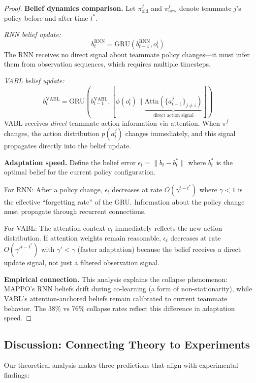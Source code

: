 \documentclass{article}
\theoremstyle{plain}
\theoremstyle{definition}
\theoremstyle{remark}
\begin{document}
\begin{proof}
\textbf{Belief dynamics comparison.}
Let $\pi_{\mathrm{old}}^j$ and $\pi_{\mathrm{new}}^j$ denote teammate $j$'s policy before and after time $t^*$.

\emph{RNN belief update:}
\[
b_t^{\mathrm{RNN}} = \text{GRU}(b_{t-1}^{\mathrm{RNN}}, o_t^i)
\]
The RNN receives no direct signal about teammate policy changes---it must infer them from observation sequences, which requires multiple timesteps.

\emph{VABL belief update:}
\[
b_t^{\mathrm{VABL}} = \text{GRU}(b_{t-1}^{\mathrm{VABL}}, [\phi(o_t^i) \| \underbrace{\mathrm{Attn}(\{a_{t-1}^j\}_{j \neq i})}_{\text{direct action signal}}])
\]
VABL receives \emph{direct} teammate action information via attention. When $\pi^j$ changes, the action distribution $p(a_t^j)$ changes immediately, and this signal propagates directly into the belief update.

\textbf{Adaptation speed.}
Define the belief error $\epsilon_t = \|b_t - b_t^*\|$ where $b_t^*$ is the optimal belief for the current policy configuration.

For RNN: After a policy change, $\epsilon_t$ decreases at rate $O(\gamma^{t-t^*})$ where $\gamma < 1$ is the effective ``forgetting rate'' of the GRU. Information about the policy change must propagate through recurrent connections.

For VABL: The attention context $c_t$ immediately reflects the new action distribution. If attention weights remain reasonable, $\epsilon_t$ decreases at rate $O(\gamma'^{t-t^*})$ with $\gamma' < \gamma$ (faster adaptation) because the belief receives a direct update signal, not just a filtered observation signal.

\textbf{Empirical connection.}
This analysis explains the collapse phenomenon: MAPPO's RNN beliefs drift during co-learning (a form of non-stationarity), while VABL's attention-anchored beliefs remain calibrated to current teammate behavior. The 38\% vs 76\% collapse rates reflect this difference in adaptation speed.
\end{proof}

\subsection{Discussion: Connecting Theory to Experiments}

Our theoretical analysis makes three predictions that align with experimental findings:
\end{document}
